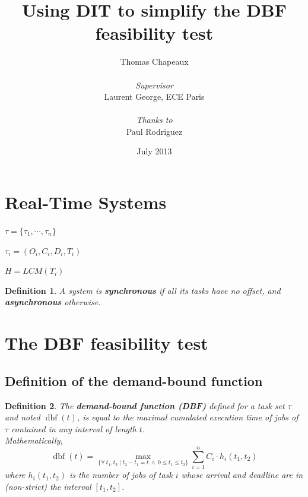 \documentclass[a4paper,10pt]{article}
\newcommand{\dbf}[1]{\operatorname{dbf}(#1)}
\newtheorem{definition}{Definition}
\begin{document}
\title{Using DIT to simplify the DBF feasibility test}
\author{Thomas Chapeaux \\ ~ \\ \emph{Supervisor} \\ Laurent George, ECE Paris \\ ~ \\ \emph{Thanks to} \\ Paul Rodriguez}

\date{July 2013}

\maketitle

\tableofcontents

\newpage

\section{Real-Time Systems}

$\tau = \{ \tau_1, \cdots, \tau_n \}$

$\tau_i = (O_i, C_i, D_i, T_i)$

$H = LCM(T_i)$

\begin{definition}
	A system is \textbf{synchronous} if all its tasks have no offset, and
	\textbf{asynchronous} otherwise.
\end{definition}

\section{The DBF feasibility test}
\label{sct:DBF}

\subsection{Definition of the demand-bound function}

\begin{definition}
	The \textbf{demand-bound function (DBF)}
	\cite{baruah1999generalized, baruah1990algorithms} defined for a task set
	$\tau$ and noted $\dbf{t}$, is equal to the maximal cumulated execution time of jobs of $\tau$ contained in any interval of length $t$.\\
	
	Mathematically,
	\[ 
		\dbf{t} = \max_{\{\forall \: t_1, t_2 \mid t_2 - t_1 = t \: \wedge \: 0
		\leqslant t_1 \leqslant t_2\}} \sum_{i=1}^n C_i \cdot h_i(t_1, t_2) 
	\] 
	where $h_i(t_1, t_2)$ is the number of jobs of task $i$ whose arrival and
	deadline are in (non-strict) the interval $[t_1, t_2]$.
\end{definition}
\end{document}
